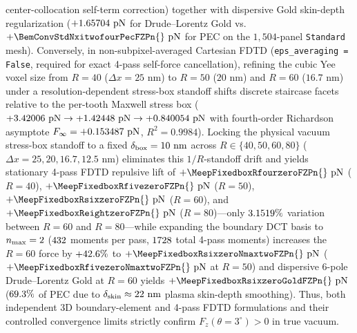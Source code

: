 \documentclass[11pt,letterpaper]{article}
\begin{document}
center-collocation self-term correction) together with dispersive Gold skin-depth regularization ($+1.65704{}\text{ pN}$ for Drude--Lorentz Gold vs.\ $+\BemConvStdNxitwofourPecFZPn{}\text{ pN}$ for PEC on the $1{,}504$-panel \texttt{Standard} mesh). Conversely, in non-subpixel-averaged Cartesian FDTD (\texttt{eps\_averaging = False}, required for exact 4-pass self-force cancellation), refining the cubic Yee voxel size from $R=40$ ($\Delta x = 25\text{ nm}$) to $R=50$ ($20\text{ nm}$) and $R=60$ ($16.7\text{ nm}$) under a resolution-dependent stress-box standoff shifts discrete staircase facets relative to the per-tooth Maxwell stress box ($+3.42006{}\text{ pN} \to +1.42448{}\text{ pN} \to +0.840054{}\text{ pN}$ with fourth-order Richardson asymptote $F_\infty = +0.153487{}\text{ pN}$, $R^2 = 0.9984$). Locking the physical vacuum stress-box standoff to a fixed $\delta_{\rm box} = 10{}\text{ nm}$ across $R \in \{40, 50, 60, 80\}$ ($\Delta x = 25, 20, 16.7, 12.5\text{ nm}$) eliminates this $1/R$-standoff drift and yields stationary 4-pass FDTD repulsive lift of $+\MeepFixedboxRfourzeroFZPn{}\text{ pN}$ ($R=40$), $+\MeepFixedboxRfivezeroFZPn{}\text{ pN}$ ($R=50$), $+\MeepFixedboxRsixzeroFZPn{}\text{ pN}$ ($R=60$), and $+\MeepFixedboxReightzeroFZPn{}\text{ pN}$ ($R=80$)---only $3.1519{}\%$ variation between $R=60$ and $R=80$---while expanding the boundary DCT basis to $n_{\rm max}=2$ ($432{}$ moments per pass, $1728{}$ total 4-pass moments) increases the $R=60$ force by $+42.6{}\%$ to $+\MeepFixedboxRsixzeroNmaxtwoFZPn{}\text{ pN}$ ($+\MeepFixedboxRfivezeroNmaxtwoFZPn{}\text{ pN}$ at $R=50$) and dispersive 6-pole Drude--Lorentz Gold at $R=60$ yields $+\MeepFixedboxRsixzeroGoldFZPn{}\text{ pN}$ ($69.3{}\%$ of PEC due to $\delta_{\rm skin} \approx 22\text{ nm}$ plasma skin-depth smoothing). Thus, both independent 3D boundary-element and 4-pass FDTD formulations and their controlled convergence limits strictly confirm $F_z(\theta=3^\circ) > 0$ in true vacuum.
\end{document}
